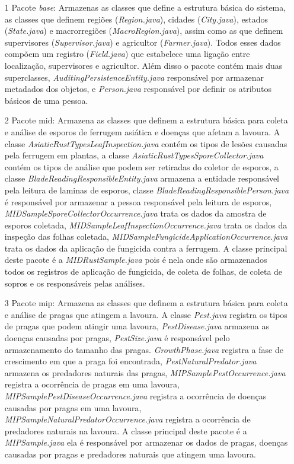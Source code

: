 \begin{itemize}

\item[1]Pacote \textit{base}: Armazenas as classes que define a estrutura básica do sistema, as classes que definem regiões (\textit{Region.java}), cidades (\textit{City.java}), estados (\textit{State.java}) e macrorregiões (\textit{MacroRegion.java}), assim como as que definem supervisores (\textit{Supervisor.java}) e agricultor (\textit{Farmer.java}). Todos esses dados compõem um registro (\textit{Field.java}) que estabelece uma ligação entre localização, supervisores e agricultor. Além disso o pacote contém mais duas superclasses, \textit{AuditingPersistenceEntity.java} responsável por armazenar metadados dos objetos, e \textit{Person.java} responsável por definir os atributos básicos de uma pessoa.  

\item[2]Pacote mid: Armazena as classes que definem a estrutura básica para coleta e análise de esporos de ferrugem asiática e doenças que afetam a lavoura. A classe \textit{AsiaticRustTypesLeafInspection.java} contém os tipos de lesões causadas pela ferrugem em plantas, a classe \textit{AsiaticRustTypesSporeCollector.java} contém os tipos de análise que podem ser retiradas do coletor de esporos, a classe \textit{BladeReadingResponsibleEntity.java} armazena a entidade responsável pela leitura de laminas de esporos, classe \textit{BladeReadingResponsiblePerson.java} é responsável por armazenar a pessoa responsável pela leitura de esporos, \textit{MIDSampleSporeCollectorOccurrence.java} trata os dados da amostra de esporos coletada, \textit{MIDSampleLeafInspectionOccurrence.java} trata os dados da inspeção das folhas coletada, \textit{MIDSampleFungicideApplicationOccurrence.java} trata os dados da aplicação de fungicida contra a ferrugem. A classe principal deste pacote é a \textit{MIDRustSample.java} pois é nela onde são armazenados todos os registros de aplicação de fungicida, de coleta de folhas, de coleta de sopros e os responsáveis pelas análises. 

\item[3]Pacote mip: Armazena as classes que definem a estrutura básica para coleta e análise de pragas que atingem a lavoura.  A classe \textit{Pest.java} registra os tipos de pragas que podem atingir uma lavoura, \textit{PestDisease.java} armazena as doenças causadas por pragas, \textit{PestSize.java} é responsável pelo armazenamento do tamanho das pragas. \textit{GrowthPhase.java} registra a fase de crescimento em que a praga foi encontrada, \textit{PestNaturalPredator.java} armazena os predadores naturais das pragas, \textit{MIPSamplePestOccurrence.java} registra a ocorrência de pragas em uma lavoura, \textit{MIPSamplePestDiseaseOccurrence.java} registra a ocorrência de doenças causadas por pragas em uma lavoura, \textit{MIPSampleNaturalPredatorOccurrence.java} registra a ocorrência de predadores naturais na lavoura. A classe principal deste pacote é a \textit{MIPSample.java} ela é responsável por armazenar os dados de pragas, doenças causadas por pragas e predadores naturais que atingem uma lavoura.


\end{itemize}
